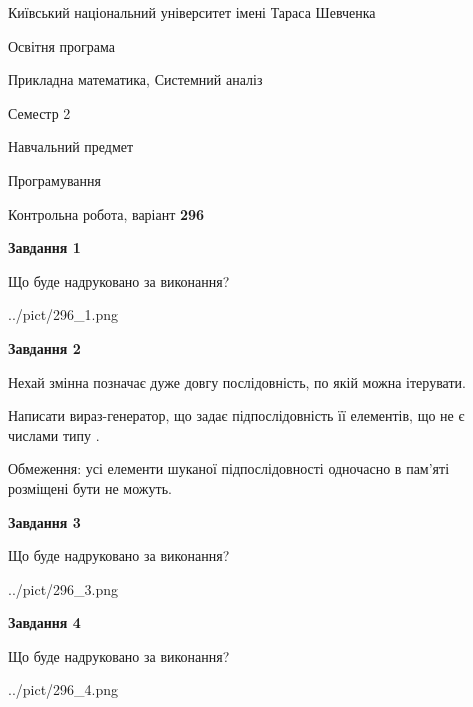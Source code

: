 \documentclass[12pt, ukrainian]{article}
\begin{document}
{{\begin {small}\par
{ \center  Київський національний університет імені Тараса Шевченка \par}
{\parbox {5 cm}{Освітня програма \hfill}{\parbox {8 cm}{Прикладна математика, Системний аналіз \hfill}}\parbox {5 cm}{\hfill Семестр 2}}\par
{\parbox {5 cm} {Навчальний предмет \hfill}\parbox {7 cm}{Програмування \hfill}\parbox {6cm}{\hfill}\par}\vspace{-7pt} \end{small}}{\center Контрольна робота, варіант  \No \textbf
{ 296 }\par}}
{
\begin {large}
{\begin {center}\textbf{Завдання 1}\end {center}}\par
Що буде надруковано за виконання?\par\par
\begin{center}
	{../pict/296_1.png}
\end{center}
\newpage

{\begin {center}\textbf{Завдання 2}\end {center}}\par
Нехай змінна  позначає дуже довгу послідовність, по якій можна ітерувати.

Написати вираз-генератор, що задає підпослідовність її елементів, що не є числами типу .

Обмеження: усі елементи шуканої підпослідовності одночасно в пам'яті розміщені бути не можуть.\par
\newpage

{\begin {center}\textbf{Завдання 3}\end {center}}\par
Що буде надруковано за виконання?\par
\begin{center}
	{../pict/296_3.png}
\end{center}
\newpage

{\begin {center}\textbf{Завдання 4}\end {center}}\par
Що буде надруковано за виконання?\par
\begin{center}
	{../pict/296_4.png}
\end{center}
\newpage


\end{large}}
\end{document}
